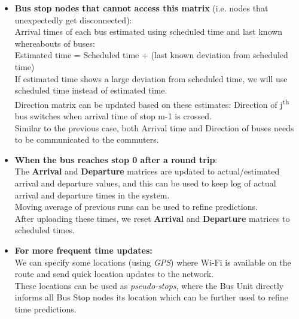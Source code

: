 \begin{itemize}
\item \textbf{Bus stop nodes that cannot access this matrix} (i.e. nodes that unexpectedly get disconnected):\\
\null \qquad Arrival times of each bus estimated using scheduled time and last known whereabouts of buses:\\
\null \qquad \qquad Estimated time = Scheduled time + (last known deviation from scheduled\\
\null \qquad \qquad time)\\
\null \qquad If estimated time shows a large deviation from scheduled time, we will use scheduled time instead of estimated time.\\
\null \qquad Direction matrix can be updated based on these estimates: Direction of j\textsuperscript{th} bus switches when arrival time of stop m-1 is crossed.\\
\null \qquad Similar to the previous case, both Arrival time and Direction of buses needs to be communicated to the commuters.

\item \textbf{When the bus reaches stop 0 after a round trip}:\\
\null \qquad The \textbf{Arrival} and \textbf{Departure} matrices are updated to actual/estimated arrival and departure values, and this can be used to keep log of actual arrival and departure times in the system.\\
\null \qquad Moving average of previous runs can be used to refine predictions.\\
\null \qquad After uploading these times, we reset \textbf{Arrival} and \textbf{Departure} matrices to scheduled times.

\item \textbf{For more frequent time updates:}\\
\null \qquad We can specify some locations (using \textit{GPS}) where Wi-Fi is available on the route and send quick location updates to the network.\\
\null \qquad These locations can be used as \textit{pseudo-stops}, where the Bus Unit directly informs all Bus Stop nodes its location which can be further used to refine time predictions.
\end{itemize}